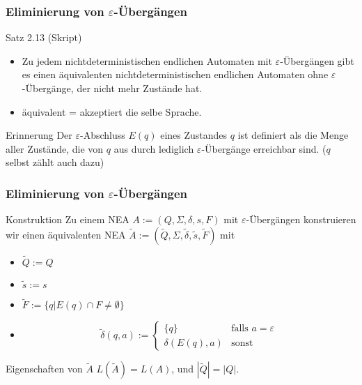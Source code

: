 \documentclass{beamer}
\begin{document}
{\begin{frame}
	\frametitle{Eliminierung von $\varepsilon$-Übergängen}
	\begin{block}{Satz 2.13 (Skript)}
	\begin{itemize}
	 \item Zu jedem nichtdeterministischen endlichen Automaten mit \(\varepsilon\)-Übergängen gibt es einen äquivalenten nichtdeterministischen
	 endlichen Automaten ohne \(\varepsilon\)-Übergänge, der nicht mehr Zustände hat.
	 \item äquivalent = akzeptiert die selbe Sprache.
	\end{itemize}
	\end{block}
	\begin{block}{Erinnerung}
		Der \(\varepsilon\)-Abschluss $E(q)$ eines Zustandes $q$ ist definiert als die Menge aller Zustände, die von $q$ aus durch lediglich \(\varepsilon\)-Übergänge erreichbar sind. ($q$ selbst zählt auch dazu)
	\end{block}
\end{frame}
\begin{frame}
\frametitle{Eliminierung von $\varepsilon$-Übergängen}
	\begin{block}{Konstruktion}
	Zu einem NEA \(A := (Q, \Sigma, \delta, s, F)\) mit \(\varepsilon\)-Übergängen konstruieren wir einen 
	  äquivalenten NEA \(\tilde{A} := (\tilde{Q}, \Sigma, \tilde{\delta}, \tilde{s}, \tilde{F})\) mit
	 \begin{itemize}
	 \item \(\tilde{Q} := Q\)
	 \item \(\tilde{s} := s\)
	 \item \(\tilde{F} := \{q|E(q)\cap F \neq \emptyset\}\)
	 \item \[\tilde{\delta}(q,a) := 
	 \begin{cases}
	  \{q\}			& \text{falls $a = \varepsilon$} \\
	 \delta(E(q),a)	& \text{sonst}
	 \end{cases}\]
	 \end{itemize}
	\end{block}
	\begin{block}{Eigenschaften von \(\tilde{A}\)}
	 \(L(\tilde{A}) = L(A)\), und \(|\tilde{Q}| = |Q|\).
	\end{block}


\end{frame}}
\end{document}
